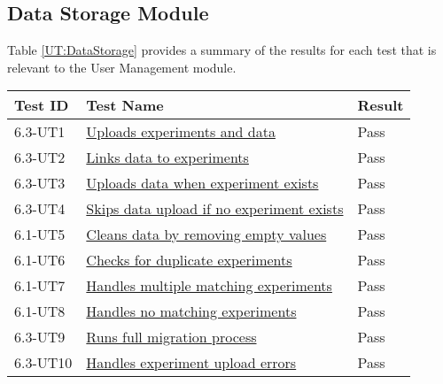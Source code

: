 \documentclass[12pt, titlepage]{article}
\begin{document}
\subsection{Data Storage Module}
Table \ref{UT:DataStorage} provides a summary of the results for each test that is
relevant to the User Management module.
\begin{table}[H]
  \centering
  \begin{tabular}{|l|l|l|}
    \hline
    \textbf{Test ID} & \textbf{Test Name} & \textbf{Result}\\
    \hline
    6.3-UT1 & \href{https://github.com/SumanyaG/Alkalytics/blob/main/src/backend/test/migrationServiceTest.py}{Uploads experiments and data} & Pass \\
    \hline
    6.3-UT2 & \href{https://github.com/SumanyaG/Alkalytics/blob/main/src/backend/test/migrationServiceTest.py}{Links data to experiments} & Pass \\
    \hline
    6.3-UT3 & \href{https://github.com/SumanyaG/Alkalytics/blob/main/src/backend/test/migrationServiceTest.py}{Uploads data when experiment exists} & Pass \\
    \hline
    6.3-UT4 & \href{https://github.com/SumanyaG/Alkalytics/blob/main/src/backend/test/migrationServiceTest.py}{Skips data upload if no experiment exists} & Pass \\
    \hline
    6.1-UT5 & \href{https://github.com/SumanyaG/Alkalytics/blob/main/src/backend/test/migrationServiceTest.py}{Cleans data by removing empty values} & Pass \\
    \hline
    6.1-UT6 & \href{https://github.com/SumanyaG/Alkalytics/blob/main/src/backend/test/migrationServiceTest.py}{Checks for duplicate experiments} & Pass \\
    \hline
    6.1-UT7 & \href{https://github.com/SumanyaG/Alkalytics/blob/main/src/backend/test/migrationServiceTest.py}{Handles multiple matching experiments} & Pass \\
    \hline
    6.1-UT8 & \href{https://github.com/SumanyaG/Alkalytics/blob/main/src/backend/test/migrationServiceTest.py}{Handles no matching experiments} & Pass \\
    \hline
    6.3-UT9 & \href{https://github.com/SumanyaG/Alkalytics/blob/main/src/backend/test/migrationServiceTest.py}{Runs full migration process} & Pass \\
    \hline
    6.3-UT10 & \href{https://github.com/SumanyaG/Alkalytics/blob/main/src/backend/test/migrationServiceTest.py}{Handles experiment upload errors} & Pass \\

\end{tabular}
\end{table}
\end{document}
